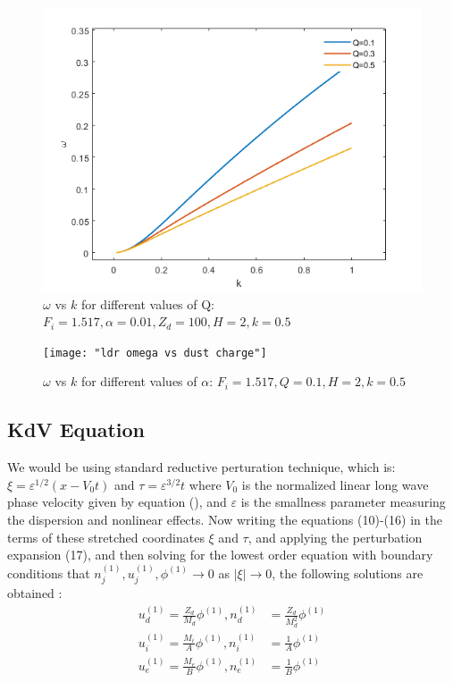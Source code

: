 \documentclass[journal]{IEEEtran}
\begin{document}
		\begin{figure}[h!]
			\centering
			\includegraphics[width =1\linewidth]{"ldr omega vs ion dust mass ratio"}
			\caption{$\omega$ vs $k$ for different values of Q: $F_i = 1.517, \alpha = 0.01, Z_d = 100, H = 2, k = 0.5$}
			\label{fig:fig2}
		\end{figure}
	
		\begin{figure}[h!]
			\centering
			\texttt{[image: "ldr omega vs dust 	charge"]}
			\caption{$\omega$ vs $k$ for different values of $\alpha$: $F_i = 1.517, Q = 0.1, H = 2, k = 0.5$}
			\label{fig:fig3}
		\end{figure}

	\subsection{KdV Equation}\vfill
	
		We would be using standard reductive perturation technique, which is: 
		$\xi = \varepsilon^{1/2}(x-V_0t)$ and $\tau = \varepsilon^{3/2}t$ 
		where $V_0$ is the normalized linear long wave phase velocity given by equation (), and $\varepsilon$ is the smallness parameter measuring the dispersion and nonlinear effects.
		Now writing the equations (10)-(16) in the terms of these stretched coordinates $\xi$ and $\tau$, and applying the perturbation expansion (17), and then solving for the lowest order equation with boundary conditions that $n_j^{(1)},u_j^{(1)}, \phi^{(1)} \rightarrow 0$ as $|\xi| \rightarrow 0$, the following solutions are obtained :	
		\begin{equation}
			\begin{split}
				u_d^{(1)} = \frac{Z_d}{M_d}\phi^{(1)}, n_d^{(1)} &= \frac{Z_d}{M_d^2}\phi^{(1)} \\
				u_i^{(1)} = \frac{M_i}{A}\phi^{(1)}, n_i^{(1)} &= \frac{1}{A}\phi^{(1)} \\
				u_e^{(1)} = \frac{M_e}{B}\phi^{(1)}, n_e^{(1)} &= \frac{1}{B}\phi^{(1)}
			\end{split}
		\end{equation}\vfill
		
\end{document}

